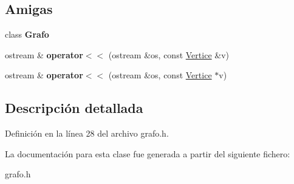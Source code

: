 \subsection*{Amigas}
\begin{DoxyCompactItemize}
\item 
\mbox{\label{classVertice_aa89bd7919924d99b99ffa9ab271175a3}} 
class {\bfseries Grafo}
\item 
\mbox{\label{classVertice_a3c70523eb9e12f80bb42762ac4708819}} 
ostream \& {\bfseries operator$<$$<$} (ostream \&os, const \hyperlink{classVertice}{Vertice} \&v)
\item 
\mbox{\label{classVertice_a11dd2c98c0d8abf3a52c680bc64ccc87}} 
ostream \& {\bfseries operator$<$$<$} (ostream \&os, const \hyperlink{classVertice}{Vertice} $\ast$v)
\end{DoxyCompactItemize}


\subsection{Descripción detallada}


Definición en la línea 28 del archivo grafo.\+h.



La documentación para esta clase fue generada a partir del siguiente fichero\+:\begin{DoxyCompactItemize}
\item 
grafo.\+h\end{DoxyCompactItemize}
